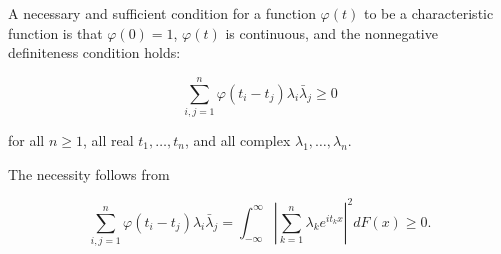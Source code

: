 A necessary and sufficient condition for a function $\varphi(t)$ to be a characteristic function is that $\varphi(0) = 1$, $\varphi(t)$ is continuous, and the nonnegative definiteness condition holds:

$$\sum_{i,j=1}^{n} \varphi(t_i - t_j) \lambda_i \bar{\lambda}_j \geq 0$$

for all $n \geq 1$, all real $t_1, \ldots, t_n$, and all complex $\lambda_1, \ldots, \lambda_n$.

The necessity follows from

$$\sum_{i,j=1}^{n} \varphi(t_i - t_j) \lambda_i \bar{\lambda}_j = \int_{-\infty}^{\infty} \left| \sum_{k=1}^{n} \lambda_k e^{it_k x} \right|^2 dF(x) \geq 0.$$

